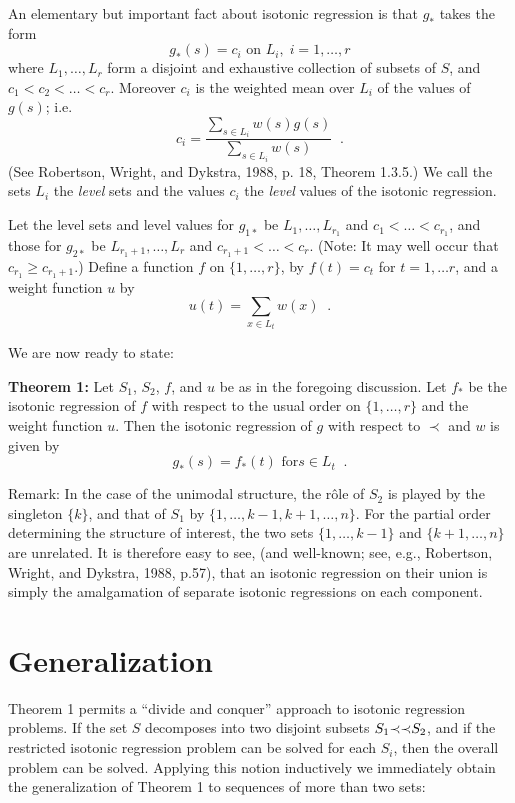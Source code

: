 An elementary but important fact about isotonic regression
is that $g_*$ takes the form \begin{displaymath} g_*(s) =
c_i \mbox{ on } L_i, \; i = 1, \ldots, r \end{displaymath}
where $L_1, \ldots, L_r$ form a disjoint and exhaustive
collection of subsets of $S$, and $c_1 < c_2 < \ldots <
c_r$.  Moreover $c_i$ is the weighted mean over $L_i$ of
the values of $g(s)$; i.e.  \begin{displaymath} c_i =
\frac{\sum_{s \in L_i} w(s)g(s)}{\sum_{s \in L_i}
w(s)}\;\;.  \end{displaymath} (See
Robertson, Wright, and Dykstra, 1988, p. 18, Theorem 1.3.5.)
We call the sets $L_i$ the {\em level} sets
and the values $c_i$ the {\em level} values of the isotonic
regression.

Let the level sets and
level values for $g_{1*}$ be $L_1, \ldots, L_{r_1}$ and
$c_1 <  \ldots <  c_{r_1}$, and those for $g_{2*}$ be
$L_{r_1+1}, \ldots, L_r$ and $c_{r_1+1} <  \ldots <  c_r$.
(Note:  It may well occur that $c_{r_1} \geq c_{r_1+1}$.)
Define a function $f$ on $\{1, \ldots, r\}$, by $f(t) =
c_t$ for $t = 1, \ldots r$, and a weight function $u$ by
\begin{displaymath} u(t) = \sum_{x \in L_t} w(x) \;\;.
\end{displaymath}

We are now ready to state:

{\bf Theorem 1:} Let $S_1$, $S_2$, $f$, and $u$ be as in
the foregoing discussion.  Let $f_*$ be the isotonic
regression of $f$ with respect to the usual order on $\{1,
\ldots, r\}$ and the weight function $u$.  Then the
isotonic regression of $g$ with respect to $\prec$ and $w$
is given by \begin{displaymath} g_*(s) = f_*(t) \mbox{ for
} s \in L_t \;\;.  \end{displaymath}

Remark:  In the case of the unimodal structure, the r\^{o}le of $S_2$
is played by the singleton $\{k\}$, and that of $S_1$ by $\{1,
\ldots, k-1, k+1, \ldots, n \}$.  For the partial order determining
the structure of interest, the two sets $\{1, \ldots, k-1 \}$ and
$\{k+1, \ldots, n \}$ are unrelated.  It is therefore easy to see,
(and well-known; see, e.g., Robertson, Wright, and Dykstra, 1988,
p.57), that an isotonic regression on their union is simply the
amalgamation of separate isotonic regressions on each component.

\section{Generalization}
\label{generalize}
Theorem 1 permits a ``divide and conquer'' approach to
isotonic regression problems.  If the set $S$ decomposes
into two disjoint subsets $S_1 \mbox{$\prec \prec$} S_2$, and if the
restricted isotonic regression problem can be solved for
each $S_i$, then the overall problem can be solved.
Applying this notion inductively we immediately obtain the
generalization of Theorem 1 to sequences of more than two
sets:

